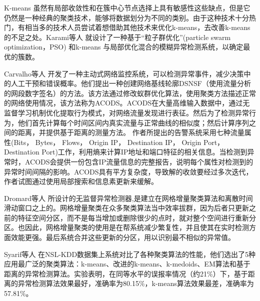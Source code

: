 K-means 虽然有局部收敛性和在簇中心节点选择上具有敏感性这些缺点，但是它仍然是一种经典的聚类技术，能够将数据划分为不同的类别。由于这种技术十分热门，有相当多的技术人员尝试着想借助其他技术来优化k-means，去改善k-means的不足之处。Karami等人\cite{2015Karami} 就设计了一种基于“粒子群优化”(particle swarm optimization，PSO) 和k-means 与局部优化混合的模糊异常检测系统，以确定最优的簇数。



Carvalho等人\cite{carvalho2016unsupervised} 开发了一种主动式网络监控系统，可以检测异常事件，减少决策中的人工干预和错误概率。他们提出一种创建网络基线轮廓DSNSF（使用流量分析的网段数字签名）的方法。该方法通过修改蚁群优化算法，使用聚类方法描述正常的网络使用情况，该方法称为ACODS。ACODS在大量高维输入数据中，通过无监督学习机制优化提取行为模式，对网络流量发现进行表征。然后为了检测异常行为，他们首先计算每个时间区间内真实流量与正常曲线的相似度；然后计算序列之间的距离，并提供基于距离的测量方法。
作者所提出的告警系统采用七种流量属性(Bits， Bytes， Flows， Origin IP， Destination IP， Origin Port， Destination Port)工作，利用熵来计算IP地址和端口特征的相关信息。当检测到异常时，ACODS会提供一份包含IP流量信息的完整报告，说明每个属性对检测到的异常时间间隔的影响。ACODS具有平方复杂度，导致解的收敛要经过多次迭代，作者试图通过使用局部搜索和信息素更新来缓解。

Dromard等人\cite{dromard2016online} 所设计的无监督异常检测器,是建立在网格增量聚类算法和离散时间滑动窗口之上的。网格增量聚类在众多聚类算法当中效率拔群，因为后者只更新之前的特征空间分区，而不是每当增加或删除很少的点时，就对整个空间进行重新分区。也因此，网格增量聚类的使用是在帮系统减少繁复性，并且使其在实时检测方面效能更强。最后系统合并这些更新的分区，用以识别最不相似的异常值。



Syarif等人\cite{2012syarif} 在NSL-KDD数据集上系统对比了各种聚类算法的性能，他们选出了5种应用最广泛的聚类算法：k-means、改进的k-means、k-medoids、EM算法和基于距离的异常检测算法。实验表明，在同等水平的误报率情况（约21\%）下，基于距离的异常检测算法效果最好，准确率为80.15\%，k-means算法效果最差，准确率为57.81\%。

